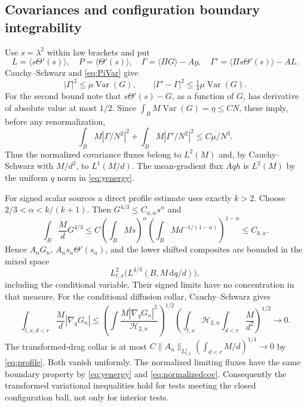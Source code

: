 \documentclass[11pt]{article}
\numberwithin{equation}{section}
\newcommand{\dd}{\,\mathrm d}
\newcommand{\grad}{\nabla}
\newcommand{\Var}{\operatorname{Var}}
\newcommand{\pair}[1]{\langle #1\rangle}
\begin{document}
\subsection{Covariances and configuration boundary integrability}\label{subsec:covariances}
Use $s=\lambda^2$ within law brackets and put
\begin{equation}\label{eq:Gammas}
 L=\pair{s\Theta'(s)},\quad P=\pair{\Theta'(s)},\quad
 \Gamma=\pair{\Pi G}-Ay,\quad
 \Gamma'=\pair{\Pi s\Theta'(s)}-AL.
\end{equation}
Cauchy--Schwarz and \eqref{eq:PiVar} give
\begin{equation}\label{eq:basiccov}
 |\Gamma|^2\leq\mu\Var(G),\qquad
 |\Gamma'-\Gamma|^2\leq\tfrac14\mu\Var(G).
\end{equation}
For the second bound note that $s\Theta'(s)-G$, as a function of $G$, has
derivative of absolute value at most $1/2$. Since
$\int_BM\Var(G)=\eta\leq CN$, these imply, before any renormalization,
\begin{equation}\label{eq:normalizedcov}
 \int_BM|\Gamma/N^2|^2+
 \int_BM|\Gamma'/N^2|^2\leq C\mu/N^3.
\end{equation}
Thus the normalized covariance fluxes belong to $L^2(M)$ and, by
Cauchy--Schwarz with $M/d^2$, to $L^1(M/d)$. The mean-gradient flux
$Aqh$ is $L^2(M)$ by the uniform $q$ norm in \eqref{eq:yenergy}.

For signed scalar sources a direct profile estimate uses exactly $k>2$.
Choose $2/3<\alpha<k/(k+1)$. Then $G^{4/3}\leq C_{a,\alpha}s^\alpha$ and
\begin{equation}\label{eq:profile}
 \int_B\frac M dG^{4/3}
 \leq C\left(\int_BMs\right)^\alpha
          \left(\int_BM d^{-1/(1-\alpha)}\right)^{1-\alpha}
 \leq C_{k,a}.
\end{equation}
Hence $A_nG_n$, $A_ns_n\Theta'(s_n)$, and the lower shifted composites
are bounded in the mixed space
\[
 L^2_{t,x}\bigl(L^{4/3}(B,M\dd q/d)\bigr),
\]
including the conditional variable. Their signed limits have no concentration
in that measure.
For the conditional diffusion collar, Cauchy--Schwarz gives
\[
 \int_{t,x,d<r}\frac M d|\grad_qG_n|
 \leq\left(\int\frac{M|\grad_qG_n|^2}{\mathcal H_{2,n}}\right)^{1/2}
       \left(\int_{t,x}\mathcal H_{2,n}\int_{d<r}\frac M{d^2}\right)^{1/2}\to0.
\]
The transformed-drag collar is at most
$C\|A_n\|_{L^1_{t,x}}(\int_{d<r}M/d)^{1/4}\to0$ by \eqref{eq:profile}.
Both vanish uniformly. The normalized limiting fluxes have the same boundary
property by \eqref{eq:yenergy} and \eqref{eq:normalizedcov}. Consequently
the transformed variational inequalities hold for tests meeting the closed
configuration ball, not only for interior tests.
\end{document}
